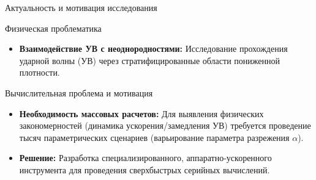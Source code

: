 \documentclass[ignoreonframetext,unicode,aspectratio=169]{beamer}
\begin{document}
	\begin{frame}{Актуальность и мотивация исследования}
		
		\begin{block}{Физическая проблематика}
			\begin{itemize}
				\item \textbf{Взаимодействие УВ с неоднородностями:} Исследование прохождения ударной волны (УВ) через стратифицированные области пониженной плотности.
			\end{itemize}
		\end{block}
		
		\begin{alertblock}{Вычислительная проблема и мотивация}
			\begin{itemize}
				\item \textbf{Необходимость массовых расчетов:} Для выявления физических закономерностей (динамика ускорения/замедления УВ) требуется проведение тысяч параметрических сценариев (варьирование параметра разрежения $\alpha$).
				\item \textbf{Решение:} Разработка специализированного, аппаратно-ускоренного инструмента для проведения сверхбыстрых серийных вычислений.
			\end{itemize}
		\end{alertblock}
		
	\end{frame}
	
\end{document}
